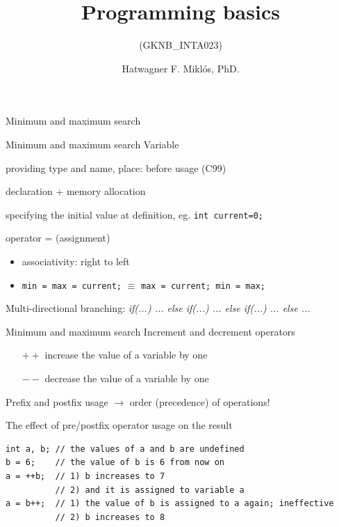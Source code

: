 \documentclass[usenames,dvipsnames,aspectratio=169]{beamer}
\title[Lecture 3.]{Programming basics}
\subtitle{(GKNB\_INTA023)}
\author{Hatwagner F. Miklós, PhD.}
\institute{Széchenyi István University, Győr, Hungary}
\newcommand{\kiemel}[1]{{\color{kiemelesszin}#1}}
\begin{document}
\begin{frame}[plain]
  \titlepage
\end{frame}

\begin{frame}{Minimum and maximum search}
    \begin{exampleblock}{}
    \tiny
    
  \end{exampleblock}
\end{frame}

\begin{frame}{Minimum and maximum search}
  Variable
  \begin{description}[initialization]
    \item[declaration] providing type and name, place: before usage (C99)
    \item[definition] declaration + memory allocation
    \item[initialization] specifying the initial value at definition, eg. \texttt{int current=0;}
  \end{description}
  \vfill
  operator = (assignment)
  \begin{itemize}
    \item associativity: right to left
    \item \texttt{min = max = current;} \kiemel{$\equiv$} \texttt{max = current; min = max;}
  \end{itemize}
  \vfill
  Multi-directional branching: \emph{if(...) ... else if(...) ... else if(...) ... else ...} \\
\end{frame}

\begin{frame}[fragile]{Minimum and maximum search}
  Increment and decrement operators
  \begin{itemize}
    \item[\texttt{$++$}] increase the value of a variable by one
    \item[\texttt{$--$}] decrease the value of a variable by one
  \end{itemize}
  Prefix and postfix usage $\to$ order (precedence) of operations!
  \vfill
  \begin{block}{The effect of pre/postfix operator usage on the result}
    \begin{verbatim}
int a, b; // the values of a and b are undefined
b = 6;    // the value of b is 6 from now on
a = ++b;  // 1) b increases to 7
          // 2) and it is assigned to variable a
a = b++;  // 1) the value of b is assigned to a again; ineffective
          // 2) b increases to 8
    \end{verbatim}
  \end{block}
\end{frame}
\end{document}
